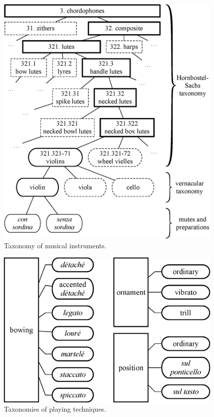 \documentclass{article}
\begin{document}
\begin{figure}[t!]
\centering
\includegraphics[width=\linewidth]{./figs/dendrograms/instrument-dendrogram.eps}
\caption{Taxonomy of musical instruments.}
\label{fig:instrument-dendrogram}
\end{figure}


\begin{figure}
\centering
\includegraphics[width=\linewidth]{./figs/dendrograms/technique-dendrogram.eps}
\caption{Taxonomies of playing techniques.}
\label{fig:technique-dendrogram}
\end{figure}
\end{document}
